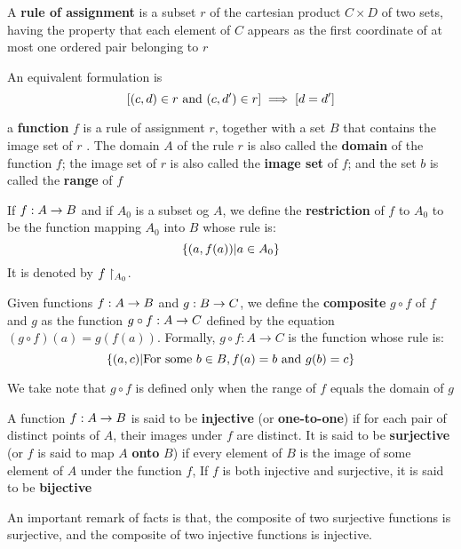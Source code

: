 \begin{define}
	A \textbf{rule of assignment} is a subset $r$ of the cartesian product $C \times D$ of two sets, having the property that each element of $C$ appears as the first coordinate of at most one ordered pair belonging to $r$
\end{define}
An equivalent formulation is
\[ [ (c,d) \in r \textrm{ and } (c,d') \in r ] \implies [d = d'] \]

\begin{define}
	a \textbf{function } $f$ is a rule of assignment $r$, together with a set $B$ that contains the image set of $r$ . The domain $A$ of the rule $r$ is also called the \textbf{domain} of the function $f$; the image set of $r$ is also called the \textbf{image set} of $f$; and the set $b$ is called the \textbf{range} of $f$
\end{define}

\begin{define}
	If $f : A \rightarrow B$ and if $A_0$ is a subset og $A$, we define the \textbf{restriction} of $f$ to $A_0$ to be the function mapping $A_0$ into $ B $ whose rule is:
	\[ \left\lbrace (a,f(a)) | a \in A_0 \right\rbrace \]
	It is denoted by $ f\restriction_{A_0} $.
\end{define}

\begin{define}
	Given functions $f : A \rightarrow B$ and $g : B \rightarrow C $, we define the \textbf{composite} $ g \circ f$ of $f$ and $g$ as the function $ g \circ f : A \rightarrow C $ defined by the equation $ (g \circ f)(a) = g(f(a)) $.
	Formally, $  g \circ f: A \rightarrow C $ is the function whose rule is:
	\[ \left\lbrace (a,c) | \textrm{For some } b \in B, f(a)= b \textrm{ and } g(b) = c \right\rbrace \]
\end{define}
We take note that $ g \circ f$ is defined only when the range of $f$ equals the domain of $g$
\begin{define}
	A function $ f : A \rightarrow B $ is said to be \textbf{injective} (or \textbf{one-to-one}) if for each pair of distinct points of $A$, their images under $f$ are distinct. It is said to be \textbf{surjective} (or $f$ is said to map $A$ \textbf{onto} $B$) if every element of $B$ is the image of some element of $A$ under the function $f$, If $f$ is both injective and surjective, it is said to be \textbf{bijective} 
\end{define}
An important remark of facts is that, the composite of two surjective functions is surjective, and the composite of two injective functions is injective.

